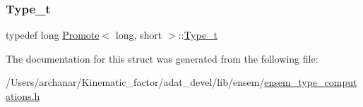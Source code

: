 \subsubsection{\texorpdfstring{Type\_t}{Type\_t}\hspace{0.1cm}{\footnotesize\ttfamily [2/2]}}
{\footnotesize\ttfamily typedef long \mbox{\hyperlink{structPromote}{Promote}}$<$ long, short $>$\+::\mbox{\hyperlink{structPromote_3_01long_00_01short_01_4_ac27097b9e5d53eee395af8cb8beb6cc1}{Type\+\_\+t}}}



The documentation for this struct was generated from the following file\+:\begin{DoxyCompactItemize}
\item 
/\+Users/archanar/\+Kinematic\+\_\+factor/adat\+\_\+devel/lib/ensem/\mbox{\hyperlink{lib_2ensem_2ensem__type__computations_8h}{ensem\+\_\+type\+\_\+computations.\+h}}\end{DoxyCompactItemize}
